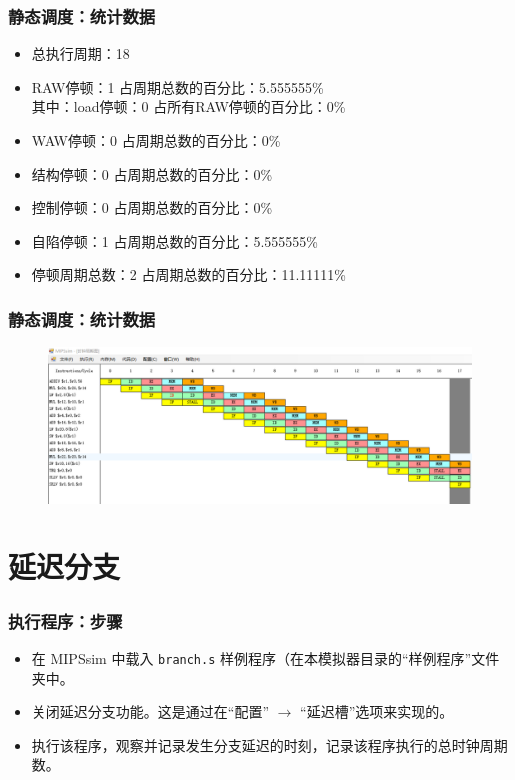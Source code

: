 \documentclass[UTF8]{ctexbeamer}
\newcommand{\code}[1]{\colorbox{light-gray}{\texttt{#1}}}
\begin{document}
\begin{frame}
    \frametitle{静态调度：统计数据}
    \begin{itemize}
        \item 总执行周期：18
        \item RAW停顿：1		占周期总数的百分比：5.555555\%
        \\ 其中：load停顿：0		占所有RAW停顿的百分比：0\%
        \item WAW停顿：0		占周期总数的百分比：0\%
        \item 结构停顿：0		占周期总数的百分比：0\%
        \item 控制停顿：0		占周期总数的百分比：0\%
        \item 自陷停顿：1		占周期总数的百分比：5.555555\%
        \item 停顿周期总数：2	占周期总数的百分比：11.11111\%
    \end{itemize}
\end{frame}

\begin{frame}
    \frametitle{静态调度：统计数据}
    \begin{figure}[H]
        \centering
        \includegraphics[width=\textwidth]{fig/after-schedule.png}
      \end{figure}
\end{frame}

\section{延迟分支}
\begin{frame}
    \frametitle{执行程序：步骤}
    \begin{itemize}
        \item 在 MIPSsim 中载入 \code{branch.s} 样例程序（在本模拟器目录的“样例程序”文件夹中。
          \item 关闭延迟分支功能。这是通过在“配置” $\rightarrow$ “延迟槽”选项来实现的。
          \item 执行该程序，观察并记录发生分支延迟的时刻，记录该程序执行的总时钟周期数。
    \end{itemize}
\end{frame}
\end{document}
